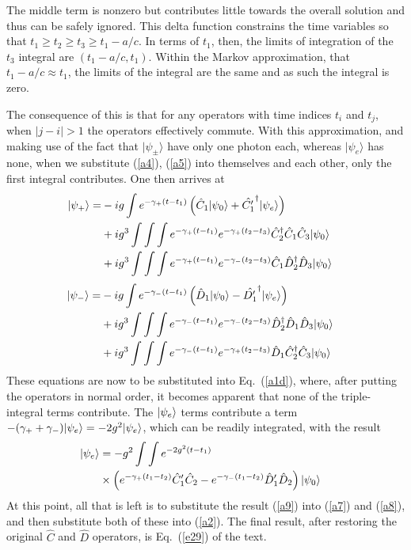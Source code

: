 \documentclass[aps,pra,twocolumn,floatfix,superscriptaddress]{revtex4}
\begin{document}
The middle term is nonzero but contributes little towards the overall solution and thus can be safely ignored. This delta function constrains the time variables so that $t_1\geq t_2\geq t_3\geq t_1-a/c$. In terms of $t_1$, then, the  limits of integration of the $t_3$ integral are $(t_1-a/c,t_1)$. Within the Markov approximation, that $t_1-a/c\approx t_1$, the limits of the integral are the same and as such the integral is zero. 

The consequence of this is that for any operators with time indices $t_i$ and $t_j$, when $|j-i|>1$ the operators effectively commute. With this approximation, and making use of the fact that $|\psi_{\pm}\rangle$ have only one photon each, whereas $|\psi_{e}\rangle$ has none, when we substitute (\ref{a4}), (\ref{a5}) into themselves and each other, only the first integral contributes.  One then arrives at
\begin{align}
|\psi_{+}\rangle = &-ig\int e^{-\gamma_+(t-t_1)} \left(\hat C_1 |\psi_0\rangle + \hat {C^\prime_1}^\dagger|\psi_{e}\rangle\right) \cr
& +i g^3\int\int \int e^{-\gamma_+(t-t_1)} e^{-\gamma_+(t_2-t_3)} \hat C^\dagger_2 \hat C_1 \hat C_3 |\psi_0\rangle \cr
& +i g^3\int\int \int e^{-\gamma_+(t-t_1)} e^{-\gamma_-(t_2-t_3)}\hat C_1\hat D^\dagger_2 \hat D_3 |\psi_0\rangle\cr
\label{a7}
\end{align}
\begin{align}
|\psi_{-}\rangle = &-ig\int e^{-\gamma_-(t-t_1)} \left(\hat D_1 |\psi_0\rangle - \hat {D^\prime_1}^\dagger|\psi_{e}\rangle\right) \cr
& +i g^3\int\int \int e^{-\gamma_-(t-t_1)} e^{-\gamma_-(t_2-t_3)} \hat D^\dagger_2 \hat D_1 \hat D_3 |\psi_0\rangle \cr
& +i g^3\int\int \int e^{-\gamma_-(t-t_1)} e^{-\gamma_+(t_2-t_3)}\hat D_1\hat C^\dagger_2 \hat C_3 |\psi_0\rangle\cr
\label{a8}
\end{align}
These equations are now to be substituted into Eq.~(\ref{a1d}), where, after putting the operators in normal order, it becomes apparent that none of the triple-integral terms contribute.  The $|\psi_e\rangle$ terms contribute a term $-(\gamma_+ +\gamma_-)|\psi_e\rangle = -2g^2|\psi_e\rangle$, which can be readily integrated, with the result
\begin{align}
|\psi_e\rangle &= -g^2 \int\int e^{-2g^2(t-t_1)} \cr
&\times\left(e^{-\gamma_+(t_1-t_2)}\hat C^\prime_1 \hat C_2 - e^{-\gamma_-(t_1-t_2)} \hat D^\prime_1 \hat D_2 \right)|\psi_0\rangle\cr
\label{a9}
\end{align}
At this point, all that is left is to substitute the result (\ref{a9}) into (\ref{a7}) and (\ref{a8}), and then substitute both of these into (\ref{a2}).  The final result, after restoring the original $\hat C$ and $\hat D$ operators, is Eq.~(\ref{e29}) of the text.
\end{document}
